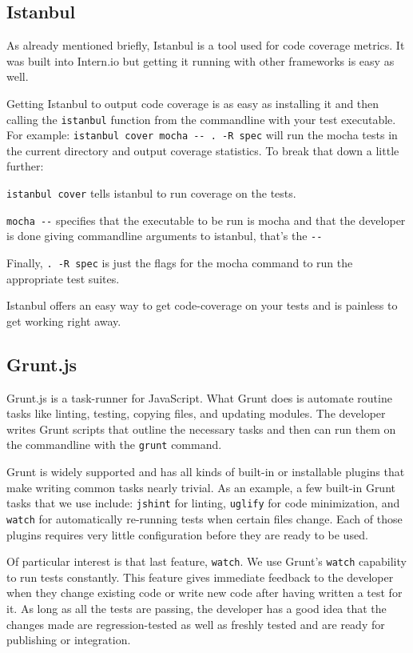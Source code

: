 \documentclass[12pt]{ucthesis}
\begin{document}
\subsection{Istanbul}
As already mentioned briefly, Istanbul \cite{Istanbul} is a tool used for code coverage metrics. It was built into Intern.io but getting it running with other frameworks is easy as well.

Getting Istanbul to output code coverage is as easy as installing it and then calling the \lstinline{istanbul} function from the commandline with your test executable.
For example: \lstinline{istanbul cover mocha -- . -R spec} will run the mocha tests in the current directory and output coverage statistics. To break that down a little further:

\lstinline{istanbul cover} tells istanbul to run coverage on the tests.

\lstinline{mocha --} specifies that the executable to be run is mocha and that the developer is done giving commandline arguments to istanbul, that's the \lstinline{--}

Finally, \lstinline{. -R spec} is just the flags for the mocha command to run the appropriate test suites.

Istanbul offers an easy way to get code-coverage on your tests and is painless to get working right away.

\subsection{Grunt.js}
Grunt.js \cite{GruntJS} is a task-runner for JavaScript. What Grunt does is automate routine tasks like linting, testing, copying files, and updating modules. The developer writes Grunt scripts that outline the necessary tasks and then can run them on the commandline with the \lstinline{grunt} command.

Grunt is widely supported and has all kinds of built-in or installable plugins that make writing common tasks nearly trivial. As an example, a few built-in Grunt tasks that we use include: \lstinline{jshint} for linting, \lstinline{uglify} for code minimization, and \lstinline{watch} for automatically re-running tests when certain files change. Each of those plugins requires very little configuration before they are ready to be used.

Of particular interest is that last feature, \lstinline{watch}. We use Grunt's \lstinline{watch} capability to run tests constantly. This feature gives immediate feedback to the developer when they change existing code or write new code after having written a test for it. As long as all the tests are passing, the developer has a good idea that the changes made are regression-tested as well as freshly tested and are ready for publishing or integration.
\end{document}
